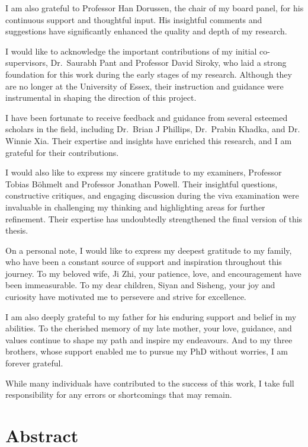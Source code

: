 \documentclass[
  12pt,
]{report}
\begin{document}
I am also grateful to Professor Han Dorussen, the chair of my board
panel, for his continuous support and thoughtful input. His insightful
comments and suggestions have significantly enhanced the quality and
depth of my research.

I would like to acknowledge the important contributions of my initial
co-supervisors, Dr.~Saurabh Pant and Professor David Siroky, who laid a
strong foundation for this work during the early stages of my research.
Although they are no longer at the University of Essex, their
instruction and guidance were instrumental in shaping the direction of
this project.

I have been fortunate to receive feedback and guidance from several
esteemed scholars in the field, including Dr.~Brian J Phillips,
Dr.~Prabin Khadka, and Dr. Winnie Xia. Their expertise and insights have
enriched this research, and I am grateful for their contributions.

I would also like to express my sincere gratitude to my examiners,
Professor Tobias Böhmelt and Professor Jonathan Powell. Their insightful
questions, constructive critiques, and engaging discussion during the
viva examination were invaluable in challenging my thinking and
highlighting areas for further refinement. Their expertise has
undoubtedly strengthened the final version of this thesis.

On a personal note, I would like to express my deepest gratitude to my
family, who have been a constant source of support and inspiration
throughout this journey. To my beloved wife, Ji Zhi, your patience,
love, and encouragement have been immeasurable. To my dear children,
Siyan and Sisheng, your joy and curiosity have motivated me to persevere
and strive for excellence.

I am also deeply grateful to my father for his enduring support and
belief in my abilities. To the cherished memory of my late mother, your
love, guidance, and values continue to shape my path and inspire my
endeavours. And to my three brothers, whose support enabled me to pursue
my PhD without worries, I am forever grateful.

While many individuals have contributed to the success of this work, I
take full responsibility for any errors or shortcomings that may remain.

\chapter*{Abstract}\label{abstract}
\end{document}
